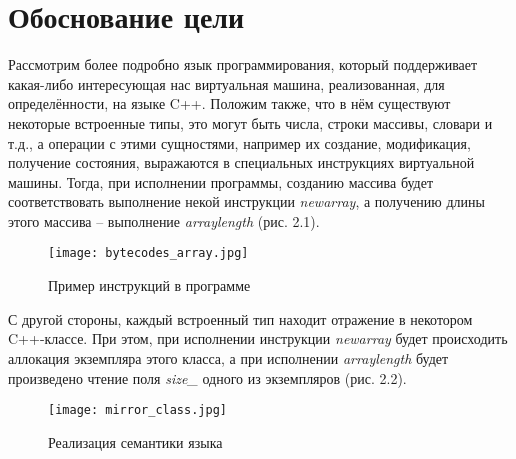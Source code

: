 \section{Обоснование цели}
Рассмотрим более подробно язык программирования, который поддерживает какая-либо интересующая нас виртуальная машина, реализованная, для определённости, на языке C++.
Положим также, что в нём существуют некоторые встроенные типы, это могут быть числа, строки массивы, словари и т.д., а операции с этими сущностями, например их создание, модификация, получение состояния, выражаются в специальных инструкциях виртуальной машины.
Тогда, при исполнении программы, созданию массива будет соответствовать выполнение некой инструкции \textit{newarray}, а получению длины этого массива -- выполнение \textit{arraylength} (рис. 2.1).

\begin{figure}[H]
    \centering
    \texttt{[image: bytecodes\_array.jpg]}
    \caption{Пример инструкций в программе}
\end{figure}

С другой стороны, каждый встроенный тип находит отражение в некотором C++-классе. При этом, при исполнении инструкции \textit{newarray} будет происходить аллокация экземпляра этого класса, а при исполнении \textit{arraylength} будет произведено чтение поля \textit{size\_} одного из экземпляров (рис. 2.2).

\begin{figure}[H]
    \centering
    \texttt{[image: mirror\_class.jpg]}
    \caption{Реализация семантики языка}
\end{figure}

